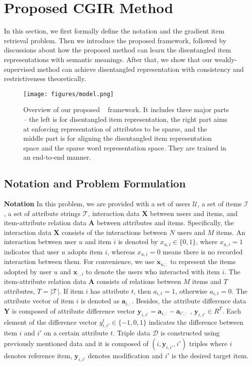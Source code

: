 \section{Proposed CGIR Method}
\label{sec:method}
In this section, we first formally define the notation and the gradient item retrieval problem. Then we introduce the proposed framework, followed by discussions about how the proposed method can learn the disentangled item representations with semantic meanings. After that, we show that our weakly-supervised method can achieve disentangled representation with consistency and restrictiveness theoretically.


\begin{figure*}[h!]
\centering
\texttt{[image: figures/model.png]}
\caption{Overview of our proposed \CGIR~ framework. It includes three major parts -- the left is for disentangled item representation, the right part aims at enforcing representation of attributes to be sparse, and the middle part is for aligning the disentangled item representation space and the sparse word representation space. They are trained in an end-to-end manner.}
\label{fig:model}
\end{figure*}

\subsection{Notation and Problem Formulation}
\textbf{Notation} In this problem, we are provided with a set of users $\mathcal{U}$, a set of items $\mathcal{I}$, a set of attribute strings $\mathcal{T}$, interaction data $\mathbf{X}$ between users and items, and item-attribute relation data $\mathbf{A}$ between attributes and items. Specifically, the interaction data $\mathbf{X}$ consists of the interactions between $N$ users and $M$ items. An interaction between user $u$ and item $i$ is denoted by $x_{u,i} \in \{0,1\}$, where $x_{u,i}=1$ indicates that user $u$ adopts item $i$, whereas $x_{u,i}=0$ means there is no recorded interaction between them. For convenience, we use $\mathbf{x}_{u,:}$ to represent the items adopted by user $u$ and $\mathbf{x}_{:,i}$ to denote the users who interacted with item $i$. The item-attribute relation data $\mathbf{A}$ consists of relations between $M$ items and $T$ attributes, $T = |\mathcal{T}|$. If item $i$ has attribute $t$, then $a_{i,t} = 1$, otherwise $a_{i,t} = 0$. The attribute vector of item $i$ is denoted as $\mathbf{a}_{i,:}$. Besides, the attribute difference data $\mathbf{Y}$ is composed of attribute difference vector $\mathbf{y}_{i,i'} = \mathbf{a}_{i,:} - \mathbf{a}_{i',:}$ , $\mathbf{y}_{i,i'} \in R^{T}$. Each element of the difference vector $y_{i,i'}^t \in \{-1,0,1\}$ indicates the difference between item $i$ and $i'$ on a certain attribute $t$. Triple data $\mathcal{D}$ is constructed using previously mentioned data and it is composed of $(i, \mathbf{y}_{i,i'}, i')$ triples where $i$ denotes reference item, $\mathbf{y}_{i,i'}$ denotes modification and $i'$ is the desired target item.

